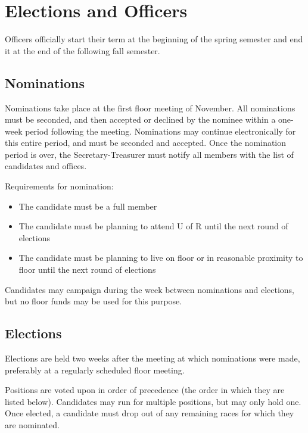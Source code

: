 \section{Elections and Officers}
\label{sec:elections-and-officers}

Officers officially start their term at the beginning of the spring semester and end it at the end of the following fall semester.



	\subsection{Nominations}

	Nominations take place at the first floor meeting of November. All nominations must be seconded, and then accepted or declined by the nominee within a one-week period following the meeting. Nominations may continue electronically for this entire period, and must be seconded and accepted. Once the nomination period is over, the Secretary-Treasurer must notify all members with the list of candidates and offices.

	Requirements for nomination:
	\begin{itemize}
		\item The candidate must be a full member
		\item The candidate must be planning to attend U of R until the next round of elections
		\item The candidate must be planning to live on floor or in reasonable proximity to floor until the next round of elections
	\end{itemize}

	Candidates may campaign during the week between nominations and elections, but no floor funds may be used for this purpose.



	\subsection {Elections}

	Elections are held two weeks after the meeting at which nominations were made, preferably at a regularly scheduled floor meeting. 

	Positions are voted upon in order of precedence (the order in which they are listed below). Candidates may run for multiple positions, but may only hold one. Once elected, a candidate must drop out of any remaining races for which they are nominated.


